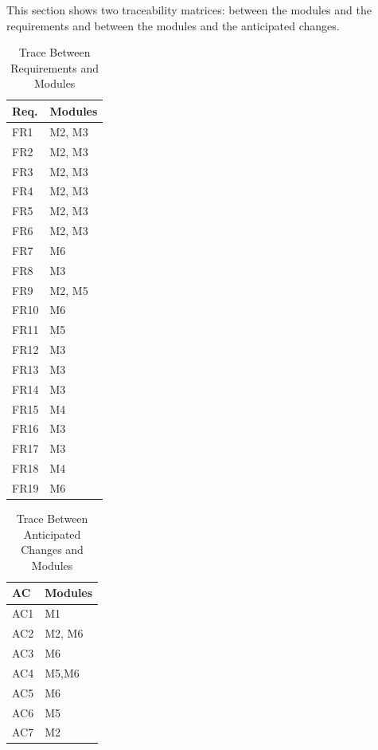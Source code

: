 \documentclass[12pt, titlepage]{article}
\begin{document}
This section shows two traceability matrices: between the modules and the
requirements and between the modules and the anticipated changes.

\begin{table}[H]
\centering
\begin{tabular}{p{} p{}}
\toprule
\textbf{Req.} & \textbf{Modules}\\
\midrule
FR1 & M2, M3\\
FR2 & M2, M3\\
FR3 & M2, M3\\
FR4 & M2, M3\\
FR5 & M2, M3\\
FR6 & M2, M3\\
FR7 & M6\\
FR8 & M3\\
FR9 & M2, M5\\
FR10 & M6\\
FR11 & M5\\
FR12 & M3\\
FR13 & M3\\
FR14 & M3\\
FR15 & M4\\
FR16 & M3\\
FR17 & M3\\
FR18 & M4\\
FR19 & M6\\

\bottomrule
\end{tabular}
\caption{Trace Between Requirements and Modules}
\label{TblRT}
\end{table}

\begin{table}[H]
\centering
\begin{tabular}{p{} p{}}
\toprule
\textbf{AC} & \textbf{Modules}\\
\midrule
AC1 & M1\\
AC2 & M2, M6\\
AC3 & M6\\
AC4 & M5,M6\\
AC5 & M6\\
AC6 & M5\\
AC7 & M2\\
\bottomrule
\end{tabular}
\caption{Trace Between Anticipated Changes and Modules}
\label{TblACT}
\end{table}
\end{document}
